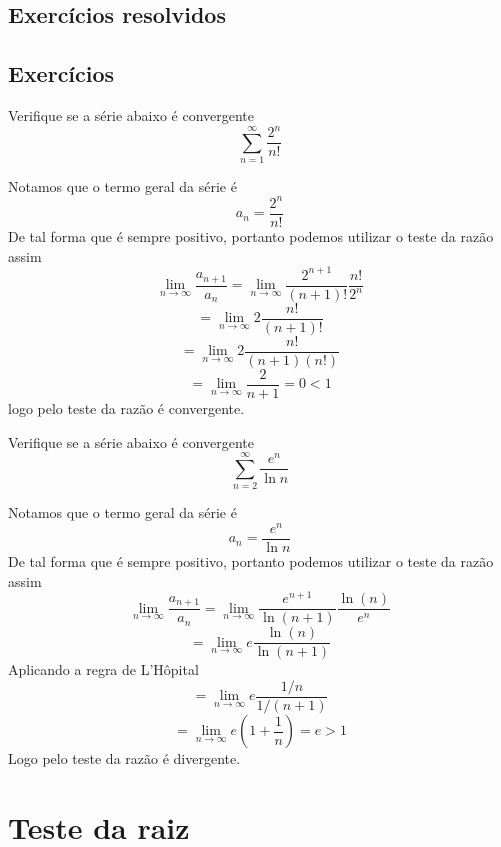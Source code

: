 \subsection*{Exercícios resolvidos}

\construirExeresol


\subsection*{Exercícios}

\construirExer

\begin{exer}
    Verifique se a série abaixo é convergente 
    $$\sum_{n =1}^{\infty} \frac{2^n}{n!}$$
\end{exer}

\begin{resp}
    Notamos que o termo geral da série é 
    $$a_n = \frac{2^n}{n!} $$
    De tal forma que é sempre positivo, portanto podemos utilizar o teste da
    razão assim
    $$ \lim_{n \to \infty} \frac{a_{n+1}}{a_n} = \lim_{n \to \infty} \frac{2^{n+1}}{(n+1)!} \frac{n!}{2^n}$$
    $$ = \lim_{n \to \infty} 2 \frac{n!}{(n+1)!}$$
    $$ = \lim_{n \to \infty} 2 \frac{n!}{(n+1)(n!)}$$
    $$ = \lim_{n \to \infty} \frac{2}{n+1} = 0 < 1 $$
    logo pelo teste da razão é convergente.
\end{resp}

\begin{exer}
    Verifique se a série abaixo é convergente 
    $$\sum_{n =2}^{\infty} \frac{e^n}{\ln n}$$
\end{exer}

\begin{resp}
    Notamos que o termo geral da série é 
    $$a_n = \frac{e^n}{\ln n} $$
    De tal forma que é sempre positivo, portanto podemos utilizar o teste da razão
    assim
    $$ \lim_{n \to \infty} \frac{a_{n+1}}{a_n} = \lim_{n \to \infty} \frac{e^{n+1}}{\ln (n+1)} \frac{\ln (n)}{e^n}$$
    $$ = \lim_{n \to \infty} e \frac{\ln (n)}{\ln(n+1)}$$
    Aplicando a regra de L'Hôpital
    $$ = \lim_{n \to \infty} e \frac{1/n}{1/(n+1)}$$
    $$ = \lim_{n \to \infty} e (1+ \frac{1}{n}) = e > 1$$
    Logo pelo teste da razão é divergente.
\end{resp}


\section{Teste da raiz}
\construirSec


